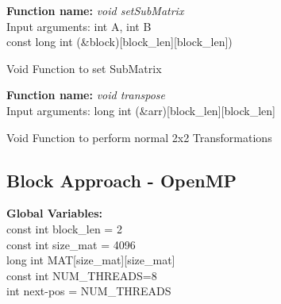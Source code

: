 \documentclass[10pt,journal]{article}
\begin{document}
\begin{algorithm}[H]
\SetAlgoLined
\textbf{Function name:} \emph{void setSubMatrix}\\\vspace{10pt}
Input arguments:\: int A, int B\\const long int (&block)[block\_len][block\_len])\\

\vspace{10pt} 
\caption{Void Function to set SubMatrix}
\end{algorithm}

\begin{algorithm}[H]
\SetAlgoLined
\textbf{Function name:} \emph{void transpose}\\\vspace{10pt}
Input arguments:\: long int (&arr)[block\_len][block\_len]\\

\vspace{10pt} 
\caption{Void Function to perform normal 2x2 Transformations}
\end{algorithm}

\newpage
\subsection{Block Approach - OpenMP}
\textbf{Global Variables:} \\

const int block\_len = 2\\ 
const int size\_mat = 4096\\
long int MAT[size\_mat][size\_mat]\\
const int NUM\_THREADS=8\\
int next-pos = NUM\_THREADS\\
\end{document}
